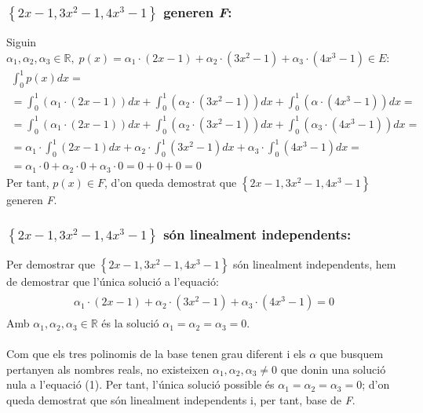 \documentclass[a4paper, 11pt]{article}
\begin{document}
            \subsubsection{${\left\{2x-1, 3x^2-1, 4x^3-1\right\}}$ generen \emph{F}:}
            Siguin ${\alpha_1,\alpha_2,\alpha_3\in\mathbb{R},\; p(x) = \alpha_1\cdot (2x-1) + \alpha_2\cdot (3x^2-1) + \alpha_3\cdot (4x^3-1) \in E}$:
            \begin{gather*}
                \int_0^1p(x)dx =\\
                = \int_0^1\left( \alpha_1\cdot (2x-1)\right)dx + \int_0^1 \left( \alpha_2\cdot (3x^2-1) \right)dx + \int_0^1 \left(\alpha\cdot (4x^3-1) \right)dx =\\
                = \int_0^1 \left( \alpha_1\cdot (2x-1) \right) dx + \int_0^1 \left( \alpha_2\cdot (3x^2-1) \right)dx + \int_0^1 \left( \alpha_3\cdot (4x^3-1) \right)dx =\\
                = \alpha_1 \cdot \int_0^1 \left(2x-1\right) dx + \alpha_2\cdot\int_0^1 \left(3x^2-1\right)dx + \alpha_3\cdot\int_0^1 \left(4x^3-1\right)dx =\\
                = \alpha_1\cdot 0 + \alpha_2\cdot 0 + \alpha_3\cdot 0 = 0 + 0 + 0 = 0
            \end{gather*}
            Per tant, ${p(x)\in F}$, d'on queda demostrat que ${\left\{2x-1, 3x^2-1, 4x^3-1\right\}}$ generen \emph{F}.

            \subsubsection{${\left\{2x-1, 3x^2-1, 4x^3-1\right\}}$ s\'on linealment independents:}
            Per demostrar que ${\left\{2x-1, 3x^2-1, 4x^3-1\right\}}$ s\'on linealment independents, hem de demostrar que l'\'unica soluci\'o a l'equaci\'o:
            \begin{align}
                \begin{aligned}
                    \alpha_1\cdot(2x-1) + \alpha_2\cdot (3x^2-1) + \alpha_3\cdot (4x^3-1) = 0
                \end{aligned}
            \end{align}
            Amb ${\alpha_1,\alpha_2,\alpha_3 \in \mathbb{R}}$ \'es la soluci\'o ${\alpha_1 = \alpha_2 = \alpha_3 = 0}$.\\\\
            Com que els tres polinomis de la base tenen grau diferent i els ${\alpha}$ que busquem pertanyen als nombres reals, no existeixen ${\alpha_1, \alpha_2, \alpha_3 \neq 0}$ que donin una soluci\'o nula a l'equaci\'o (1). Per tant, l'\'unica soluci\'o possible \'es ${\alpha_1 = \alpha_2 = \alpha_3 = 0}$; d'on queda demostrat que s\'on linealment independents i, per tant, base de \emph{F}.
\end{document}

